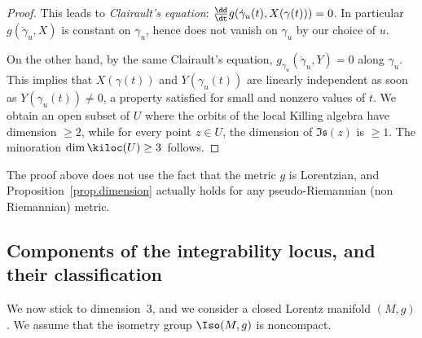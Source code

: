 \begin{proof}
This leads to \emph{Clairault's equation}: $\frac{\dd}{\dt}g(\dot{\gamma}_u(t),X(\gamma(t)))=0$. In particular $g(\dot{\gamma}_u,X)$ is constant on $\gamma_u$, hence does not vanish on $\gamma_u$ by our choice of $u$.

On the other hand, by the same Clairault's equation, $g_{\gamma_u}(\dot{\gamma}_u,Y) =0$ along $\gamma_u$. This implies that $X(\gamma(t))$ and $Y(\gamma_u(t))$ are linearly independent as soon as $Y(\gamma_u(t)) \not =0$, a property satisfied for small and nonzero values of $t$. We obtain an open subset of $U$ where the orbits of the local Killing algebra have dimension $\geq 2$, while for every point $z \in U$, the dimension of $\mathfrak{Is}(z)$ is $\geq 1$. The minoration $\dim \kiloc(U) \geq 3$~follows.
\end{proof}

\begin{rema}\label{rem.pseudoRiemannian}
The proof above does not use the fact that the metric $g$ is Lorentzian, and Proposition~\ref{prop.dimension} actually holds for any pseudo-Riemannian (non Riemannian) metric.
\end{rema}

\subsection{Components of the integrability locus, and their classification}
\label{sec.components}
We now stick to dimension~$3$, and we consider a closed Lorentz manifold $(M,g)$. We assume that the isometry group $\Iso(M,g)$ is noncompact.

